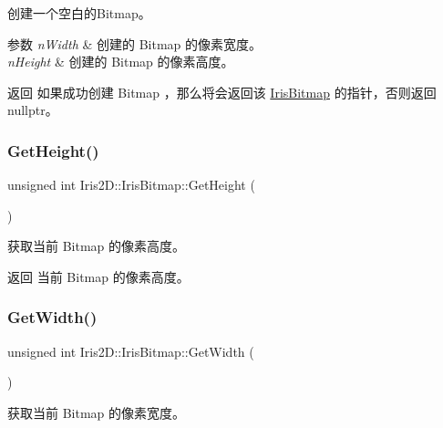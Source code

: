 创建一个空白的\+Bitmap。 


\begin{DoxyParams}{参数}
{\em n\+Width} & 创建的 Bitmap 的像素宽度。 \\
\hline
{\em n\+Height} & 创建的 Bitmap 的像素高度。 \\
\hline
\end{DoxyParams}
\begin{DoxyReturn}{返回}
如果成功创建 Bitmap ，那么将会返回该 \hyperlink{class_iris2_d_1_1_iris_bitmap}{Iris\+Bitmap} 的指针，否则返回 nullptr。 
\end{DoxyReturn}
\mbox{\label{class_iris2_d_1_1_iris_bitmap_ad97028fda44cce4622d8ab78d8ba16b9}} 
\subsubsection{\texorpdfstring{Get\+Height()}{GetHeight()}}
{\footnotesize\ttfamily unsigned int Iris2\+D\+::\+Iris\+Bitmap\+::\+Get\+Height (\begin{DoxyParamCaption}{ }\end{DoxyParamCaption})}



获取当前 Bitmap 的像素高度。 

\begin{DoxyReturn}{返回}
当前 Bitmap 的像素高度。 
\end{DoxyReturn}
\mbox{\label{class_iris2_d_1_1_iris_bitmap_a5bf259139daf86b07d8f0ff8dad44302}} 
\subsubsection{\texorpdfstring{Get\+Width()}{GetWidth()}}
{\footnotesize\ttfamily unsigned int Iris2\+D\+::\+Iris\+Bitmap\+::\+Get\+Width (\begin{DoxyParamCaption}{ }\end{DoxyParamCaption})}



获取当前 Bitmap 的像素宽度。 

